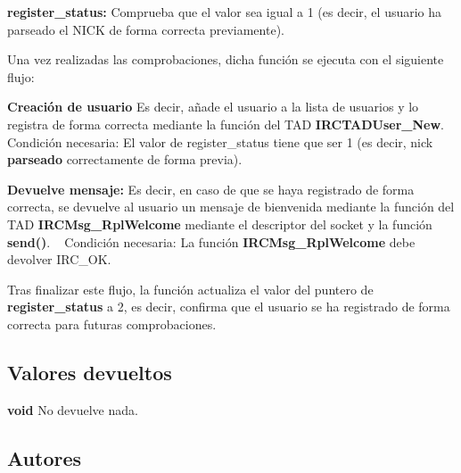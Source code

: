 \begin{DoxyItemize}
\item {\bfseries register\+\_\+status\+:} Comprueba que el valor sea igual a 1 (es decir, el usuario ha parseado el N\+I\+CK de forma correcta previamente). 
\end{DoxyItemize}

Una vez realizadas las comprobaciones, dicha función se ejecuta con el siguiente flujo\+:


\begin{DoxyItemize}
\item {\bfseries Creación de usuario} Es decir, añade el usuario a la lista de usuarios y lo registra de forma correcta mediante la función del T\+AD {\bfseries I\+R\+C\+T\+A\+D\+User\+\_\+\+New}. ~\newline
Condición necesaria\+: El valor de register\+\_\+status tiene que ser 1 (es decir, nick {\bfseries parseado} correctamente de forma previa).  
\item {\bfseries Devuelve mensaje\+:} Es decir, en caso de que se haya registrado de forma correcta, se devuelve al usuario un mensaje de bienvenida mediante la función del T\+AD {\bfseries I\+R\+C\+Msg\+\_\+\+Rpl\+Welcome} mediante el descriptor del socket y la función {\bfseries send()}. ~\newline
Condición necesaria\+: La función {\bfseries I\+R\+C\+Msg\+\_\+\+Rpl\+Welcome} debe devolver I\+R\+C\+\_\+\+OK.  
\end{DoxyItemize}

Tras finalizar este flujo, la función actualiza el valor del puntero de {\bfseries register\+\_\+status} a 2, es decir, confirma que el usuario se ha registrado de forma correcta para futuras comprobaciones. \hypertarget{server_command_user_return_user}{}\subsection{Valores devueltos}\label{server_command_user_return_user}

\begin{DoxyItemize}
\item {\bfseries void} No devuelve nada. 
\end{DoxyItemize}\hypertarget{server_command_user_authors_user}{}\subsection{Autores}\label{server_command_user_authors_user}

